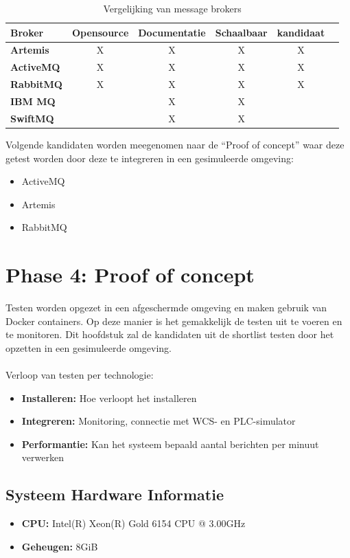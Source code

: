 \begin{table}[h!]
  \centering
  \footnotesize
\begin{tabular}{|l|c|c|c|c|c|}
  \hline
  \textbf{Broker} & \textbf{Opensource} & \textbf{Documentatie} & \textbf{Schaalbaar} & \textbf{kandidaat}\\ \hline
  \textbf{Artemis}   & X & X & X & X \\ \hline
  \textbf{ActiveMQ}  & X & X & X & X \\ \hline
  \textbf{RabbitMQ}  & X & X & X & X \\ \hline  
  \textbf{IBM MQ}    &   & X & X &  \\ \hline 
  \textbf{SwiftMQ}   &   & X & X &  \\ \hline 
\end{tabular}
\caption{Vergelijking van message brokers}
\label{tab:vergelijking_message_brokers_should_have}
\end{table}

Volgende kandidaten worden meegenomen naar de ``Proof of concept'' waar deze getest worden door deze te integreren in een gesimuleerde omgeving:
\begin{itemize}
  \item ActiveMQ
  \item Artemis
  \item RabbitMQ
\end{itemize}
    
\section{Phase 4: Proof of concept}
Testen worden opgezet in een afgeschermde omgeving en maken gebruik van Docker containers.
Op deze manier is het gemakkelijk de testen uit te voeren en te monitoren.
Dit hoofdstuk zal de kandidaten uit de shortlist testen door het opzetten in een gesimuleerde omgeving.
\\\\
Verloop van testen per technologie:
\begin{itemize}
  \item \textbf{Installeren:} Hoe verloopt het installeren
  \item \textbf{Integreren:} Monitoring, connectie met WCS- en PLC-simulator
  \item \textbf{Performantie:} Kan het systeem bepaald aantal berichten per minuut verwerken
\end{itemize}

\subsection{Systeem Hardware Informatie}
\begin{itemize}
    \item \textbf{CPU:} Intel(R) Xeon(R) Gold 6154 CPU @ 3.00GHz
    \item \textbf{Geheugen:} 8GiB
\end{itemize}

